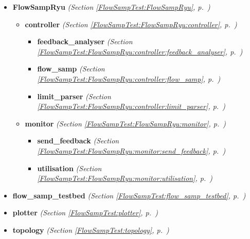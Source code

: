 \begin{itemize}
\setlength{\parskip}{0ex}
\item \textbf{FlowSampRyu}
  \textit{(Section \ref{FlowSampTest:FlowSampRyu}, p.~\pageref{FlowSampTest:FlowSampRyu})}

  \begin{itemize}
\setlength{\parskip}{0ex}
    \item \textbf{controller}
  \textit{(Section \ref{FlowSampTest:FlowSampRyu:controller}, p.~\pageref{FlowSampTest:FlowSampRyu:controller})}

      \begin{itemize}
    \setlength{\parskip}{0ex}
        \item \textbf{feedback\_analyser}
  \textit{(Section \ref{FlowSampTest:FlowSampRyu:controller:feedback_analyser}, p.~\pageref{FlowSampTest:FlowSampRyu:controller:feedback_analyser})}

        \item \textbf{flow\_samp}
  \textit{(Section \ref{FlowSampTest:FlowSampRyu:controller:flow_samp}, p.~\pageref{FlowSampTest:FlowSampRyu:controller:flow_samp})}

        \item \textbf{limit\_parser}
  \textit{(Section \ref{FlowSampTest:FlowSampRyu:controller:limit_parser}, p.~\pageref{FlowSampTest:FlowSampRyu:controller:limit_parser})}

      \end{itemize}
    \item \textbf{monitor}
  \textit{(Section \ref{FlowSampTest:FlowSampRyu:monitor}, p.~\pageref{FlowSampTest:FlowSampRyu:monitor})}

      \begin{itemize}
    \setlength{\parskip}{0ex}
        \item \textbf{send\_feedback}
  \textit{(Section \ref{FlowSampTest:FlowSampRyu:monitor:send_feedback}, p.~\pageref{FlowSampTest:FlowSampRyu:monitor:send_feedback})}

        \item \textbf{utilisation}
  \textit{(Section \ref{FlowSampTest:FlowSampRyu:monitor:utilisation}, p.~\pageref{FlowSampTest:FlowSampRyu:monitor:utilisation})}

      \end{itemize}
  \end{itemize}
\item \textbf{flow\_samp\_testbed}
  \textit{(Section \ref{FlowSampTest:flow_samp_testbed}, p.~\pageref{FlowSampTest:flow_samp_testbed})}

\item \textbf{plotter}
  \textit{(Section \ref{FlowSampTest:plotter}, p.~\pageref{FlowSampTest:plotter})}

\item \textbf{topology}
  \textit{(Section \ref{FlowSampTest:topology}, p.~\pageref{FlowSampTest:topology})}

\end{itemize}


